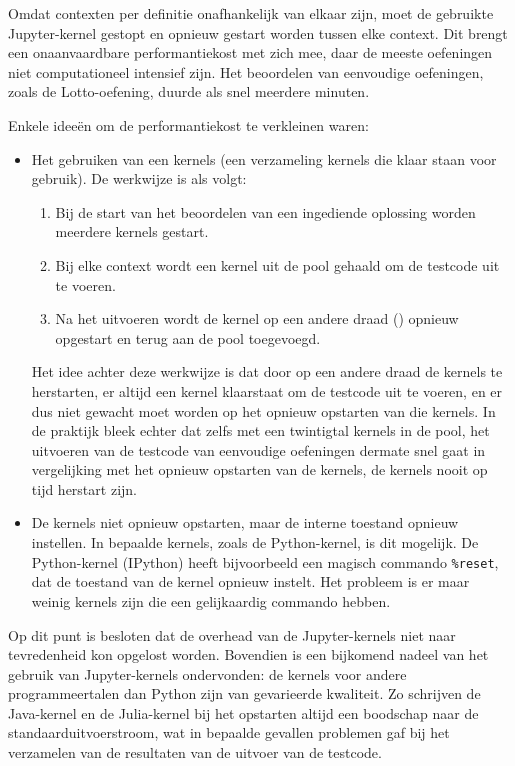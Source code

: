Omdat contexten per definitie onafhankelijk van elkaar zijn, moet de gebruikte Jupyter-kernel gestopt en opnieuw gestart worden tussen elke context.
Dit brengt een onaanvaardbare performantiekost met zich mee, daar de meeste oefeningen niet computationeel intensief zijn.
Het beoordelen van eenvoudige oefeningen, zoals de Lotto-oefening, duurde als snel meerdere minuten.

Enkele ideeën om de performantiekost te verkleinen waren:

\begin{itemize}
    \item Het gebruiken van een  kernels (een verzameling kernels die klaar staan voor gebruik).
    De werkwijze is als volgt:
    \begin{enumerate}
        \item Bij de start van het beoordelen van een ingediende oplossing worden meerdere kernels gestart.
        \item Bij elke context wordt een kernel uit de pool gehaald om de testcode uit te voeren.
        \item Na het uitvoeren wordt de kernel op een andere draad () opnieuw opgestart en terug aan de pool toegevoegd.
    \end{enumerate}
    Het idee achter deze werkwijze is dat door op een andere draad de kernels te herstarten, er altijd een kernel klaarstaat om de testcode uit te voeren, en er dus niet gewacht moet worden op het opnieuw opstarten van die kernels.
    In de praktijk bleek echter dat zelfs met een twintigtal kernels in de pool, het uitvoeren van de testcode van eenvoudige oefeningen dermate snel gaat in vergelijking met het opnieuw opstarten van de kernels, de kernels nooit op tijd herstart zijn.
    \item De kernels niet opnieuw opstarten, maar de interne toestand opnieuw instellen.
    In bepaalde kernels, zoals de Python-kernel, is dit mogelijk.
    De Python-kernel (IPython) heeft bijvoorbeeld een magisch commando \texttt{\%reset}, dat de toestand van de kernel opnieuw instelt.
    Het probleem is er maar weinig kernels zijn die een gelijkaardig commando hebben.
\end{itemize}

Op dit punt is besloten dat de overhead van de Jupyter-kernels niet naar tevredenheid kon opgelost worden.
Bovendien is een bijkomend nadeel van het gebruik van Jupyter-kernels ondervonden: de kernels voor andere programmeertalen dan Python zijn van gevarieerde kwaliteit.
Zo schrijven de Java-kernel en de Julia-kernel bij het opstarten altijd een boodschap naar de standaarduitvoerstroom, wat in bepaalde gevallen problemen gaf bij het verzamelen van de resultaten van de uitvoer van de testcode.

